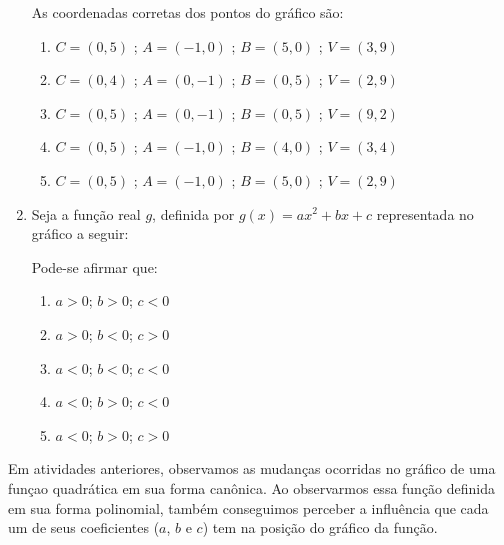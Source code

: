 \begin{enumerate}
As coordenadas corretas dos pontos do gráfico são:
\begin{enumerate}
\item {} 
\(C=(0,5)\)  ;  \(A=(-1,0)\)  ; \(B=(5,0)\)  ; \(V=(3,9)\)

\item {} 
\(C=(0,4)\)  ;  \(A=(0,-1)\)  ; \(B=(0,5)\)  ; \(V=(2,9)\)

\item {} 
\(C=(0,5)\)  ;  \(A=(0,-1)\)  ; \(B=(0,5)\)  ; \(V=(9,2)\)

\item {} 
\(C=(0,5)\)  ;  \(A=(-1,0)\)  ; \(B=(4,0)\)  ; \(V=(3,4)\)

\item {} 
\(C=(0,5)\)  ;  \(A=(-1,0)\)  ; \(B=(5,0)\)  ; \(V=(2,9)\)

\end{enumerate}

\item Seja a função real \(g\), definida por \(g(x)=ax^2+bx+c\) representada no gráfico a seguir:
\begin{figure}[H]
\centering

\end{figure}

Pode-se afirmar que:
\begin{enumerate}
\item {} 
\(a>0\); \(b>0\); \(c<0\)

\item {} 
\(a>0\); \(b<0\); \(c>0\)

\item {} 
\(a<0\); \(b<0\); \(c<0\)

\item {} 
\(a<0\); \(b>0\); \(c<0\)

\item {} 
\(a<0\); \(b>0\); \(c>0\)

\end{enumerate}
\end{enumerate}

\label{\detokenize{AF209-8::doc}}\label{\detokenize{AF209-8:sec-funcao-quadratica-org-ideias-intersecoes-com-eixos}}\label{\detokenize{AF209-8:organizando-as-ideias-intersecao-com-os-eixos-coordenados}}
Em atividades anteriores, observamos as mudanças ocorridas no gráfico de uma funçao quadrática em sua forma canônica. Ao observarmos essa função definida em sua forma polinomial, também conseguimos perceber a influência que cada um de seus coeficientes (\(a\), \(b\) e  \(c\)) tem na posição do gráfico da função.

